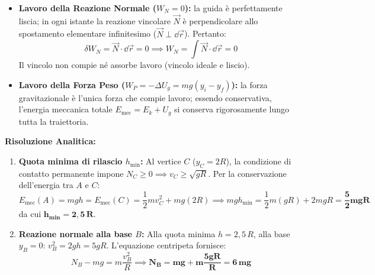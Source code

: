 \begin{tcolorbox}[enhanced, breakable, colback=forestgreen!5!white, colframe=forestgreen!80!black,
    title={\textbf{Analisi del Lavoro delle Forze in Gioco}}, fonttitle=\bfseries\sffamily]
\begin{itemize}
    \item \textbf{Lavoro della Reazione Normale ($W_N = 0$):} la guida è perfettamente liscia; in ogni istante la reazione vincolare $\vec{N}$ è perpendicolare allo spostamento elementare infinitesimo ($\vec{N} \perp \dd\vec{r}$). Pertanto:
    \begin{equation}
        \delta W_N = \vec{N}\cdot\dd\vec{r} = 0 \implies W_N = \int \vec{N}\cdot\dd\vec{r} = 0
    \end{equation}
    Il vincolo non compie né assorbe lavoro (vincolo ideale e liscio).
    \item \textbf{Lavoro della Forza Peso ($W_P = -\Delta U_g = mg(y_i - y_f)$):} la forza gravitazionale è l'unica forza che compie lavoro; essendo conservativa, l'energia meccanica totale $E_{\text{mec}} = E_k + U_g$ si conserva rigorosamente lungo tutta la traiettoria.
\end{itemize}
\end{tcolorbox}

\textbf{Risoluzione Analitica:}
\begin{enumerate}
    \item \textbf{Quota minima di rilascio $h_{\min}$:}
    Al vertice $C$ ($y_C = 2R$), la condizione di contatto permanente impone $N_C \ge 0 \implies v_C \ge \sqrt{gR}$.
    Per la conservazione dell'energia tra $A$ e $C$:
    \begin{equation}
        E_{\text{mec}}(A) = mgh = E_{\text{mec}}(C) = \frac{1}{2}m v_C^2 + mg(2R) \implies mgh_{\min} = \frac{1}{2}m(gR) + 2mgR = \mathbf{\frac{5}{2}mgR}
    \end{equation}
    da cui $\mathbf{h_{\min} = 2{,}5\,R}$.
    
    \item \textbf{Reazione normale alla base $B$:}
    Alla quota minima $h = 2{,}5\,R$, alla base $y_B = 0$: $v_B^2 = 2gh = 5gR$.
    L'equazione centripeta fornisce:
    \begin{equation}
        N_B - mg = m\frac{v_B^2}{R} \implies \mathbf{N_B = mg + m\frac{5gR}{R} = 6\,mg}
    \end{equation}
\end{enumerate}

\vspace{0.8em}

